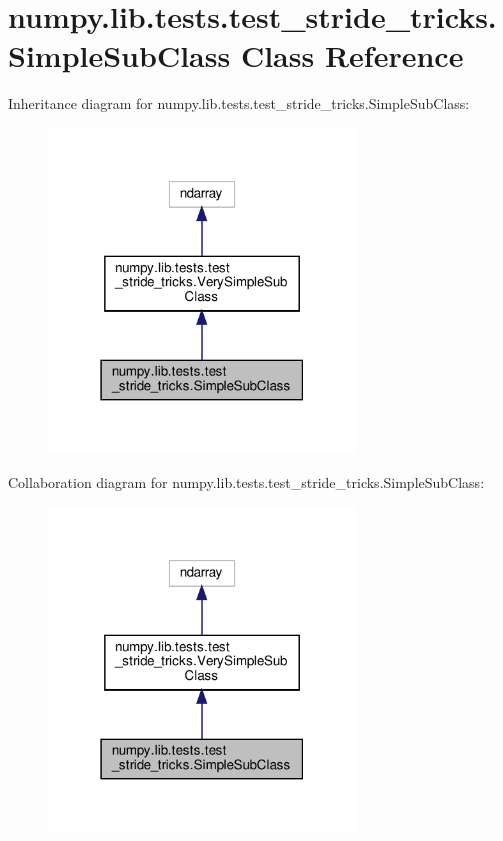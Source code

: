 \hypertarget{classnumpy_1_1lib_1_1tests_1_1test__stride__tricks_1_1SimpleSubClass}{}\section{numpy.\+lib.\+tests.\+test\+\_\+stride\+\_\+tricks.\+Simple\+Sub\+Class Class Reference}
\label{classnumpy_1_1lib_1_1tests_1_1test__stride__tricks_1_1SimpleSubClass}


Inheritance diagram for numpy.\+lib.\+tests.\+test\+\_\+stride\+\_\+tricks.\+Simple\+Sub\+Class\+:
\nopagebreak
\begin{figure}[H]
\begin{center}
\leavevmode
\includegraphics[width=231pt]{classnumpy_1_1lib_1_1tests_1_1test__stride__tricks_1_1SimpleSubClass__inherit__graph}
\end{center}
\end{figure}


Collaboration diagram for numpy.\+lib.\+tests.\+test\+\_\+stride\+\_\+tricks.\+Simple\+Sub\+Class\+:
\nopagebreak
\begin{figure}[H]
\begin{center}
\leavevmode
\includegraphics[width=231pt]{classnumpy_1_1lib_1_1tests_1_1test__stride__tricks_1_1SimpleSubClass__coll__graph}
\end{center}
\end{figure}
